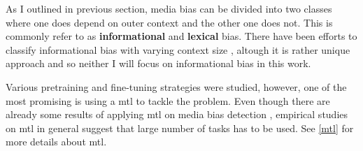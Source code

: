 As I outlined in previous section, media bias can be divided into two classes where one does depend on outer context and the other one does not. This is commonly refer to as \textbf{informational} and \textbf{lexical} bias. There have been efforts to classify informational bias with varying context size \cite{van2020context}, altough it is rather unique approach and so neither I will focus on informational bias in this work.

Various pretraining and fine-tuning strategies were studied, however, one of the most promising is using a \Gls{mtl} to tackle the problem. Even though there are already some results of applying \Gls{mtl} on media bias detection \cite{lee2021unifying,spindeexploiting}, empirical studies on \Gls{mtl} in general suggest that large number of tasks has to be used. See \ref{mtl} for more details about \gls{mtl}. 